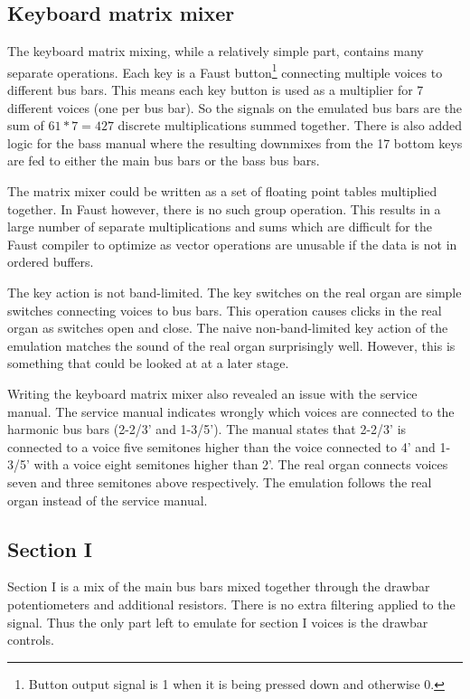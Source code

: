 \documentclass[11pt,a4paper]{article}
\begin{document}
\subsection{Keyboard matrix mixer}

The keyboard matrix mixing, while a relatively simple part, contains many separate operations. Each key is a Faust button\footnote{Button output signal is 1 when it is being pressed down and otherwise 0.} connecting multiple voices to different bus bars. This means each key button is used as a multiplier for 7 different voices (one per bus bar). So the signals on the emulated bus bars are the sum of $61*7 = 427$ discrete multiplications summed together. There is also added logic for the bass manual where the resulting downmixes from the 17 bottom keys are fed to either the main bus bars or the bass bus bars.

The matrix mixer could be written as a set of floating point tables multiplied together. In Faust however, there is no such group operation. This results in a large number of separate multiplications and sums which are difficult for the Faust compiler to optimize as vector operations are unusable if the data is not in ordered buffers.

The key action is not band-limited. The key switches on the real organ are simple switches connecting voices to bus bars. This operation causes clicks in the real organ as switches open and close. The naive non-band-limited key action of the emulation matches the sound of the real organ surprisingly well. However, this is something that could be looked at at a later stage.

Writing the keyboard matrix mixer also revealed an issue with the service manual. The service manual indicates wrongly which voices are connected to the harmonic bus bars (2-2/3' and 1-3/5'). The manual states that 2-2/3' is connected to a voice five semitones higher than the voice connected to 4' and 1-3/5' with a voice eight semitones higher than 2'. The real organ connects voices seven and three semitones above respectively. The emulation follows the real organ instead of the service manual.

\subsection{Section I}
\label{section:section-I}

Section I is a mix of the main bus bars mixed together through the drawbar potentiometers and additional resistors. There is no extra filtering applied to the signal. Thus the only part left to emulate for section I voices is the drawbar controls.
\end{document}
